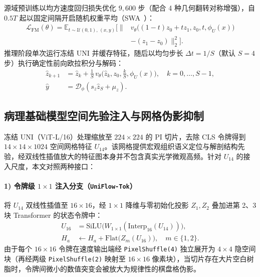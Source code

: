 \documentclass[journal]{IEEEtran}
\begin{document}
源域预训练以均方速度回归损失优化 $9{,}600$ 步（配合 4 种几何翻转对称增强），自 $0.5T$ 起以固定间隔开启随机权重平均（SWA~\cite{ref_swa}）：
\begin{equation}
\begin{aligned}
\mathcal{L}_{\text{FM}}(\theta) = \mathbb{E}_{t\sim\mathcal{U}(0,1),\,(x,y)}\Big[\big\| & v_\theta\big((1-t)z_0 + t z_1, z_0, t, \phi_U(x)\big) \\
& - (z_1 - z_0)\big\|_2^2\Big].
\end{aligned}
\end{equation}
推理阶段单次运行冻结 UNI 并缓存特征，随后以均匀步长 $\Delta t = 1/S$（默认 $S=4$ 步）执行确定性前向欧拉积分与解码：
\begin{equation}
\begin{aligned}
\hat{z}_{k+1} &= \hat{z}_k + \frac{1}{S}\, v_\theta\Big(\hat{z}_k, z_0, \frac{k}{S}, \phi_U(x)\Big), \quad k=0,\dots,S-1, \\
\hat{y} &= \mathcal{D}_\phi(s_z \hat{z}_S + \mu_z).
\end{aligned}
\end{equation}

\subsection{病理基础模型空间先验注入与网格伪影抑制}\label{sec:uni_inject}
冻结 UNI（ViT-L/16）处理缩放至 $224\times 224$ 的 PI 切片，去除 CLS 令牌得到 $14\times 14\times 1024$ 空间网格特征 $U_{14}$。该网格提供宏观组织语义定位与解剖结构先验，经双线性插值放大的特征图本身并不包含真实光学微观高频。针对 $U_{14}$ 的接入尺度，本文对照两种接口：

\paragraph{1) 令牌级 $1\times 1$ 注入分支（\texttt{UniFlow-Tok}）} 将 $U_{14}$ 双线性插值至 $16\times 16$，经 $1\times 1$ 降维与零初始化投影 $Z_1, Z_2$ 叠加进第 2、3 块 Transformer 的状态令牌中：
\begin{equation}
\begin{aligned}
U_{16} &= \text{SiLU}\big(W_{1\times 1}(\text{Interp}_{16}(U_{14}))\big), \\
H_a &\leftarrow H_a + \text{Flat}\big(Z_m(U_{16})\big), \quad m\in\{1,2\}.
\end{aligned}
\end{equation}
由于每个 $16\times 16$ 令牌在速度输出端经 \texttt{PixelShuffle(4)} 独立展开为 $4\times 4$ 隐空间块（再经两级 \texttt{PixelShuffle(2)} 映射至 $16\times 16$ 像素块），当切片存在大片空白树脂时，令牌间微小的数值突变会被放大为规律性的棋盘格伪影。
\end{document}

